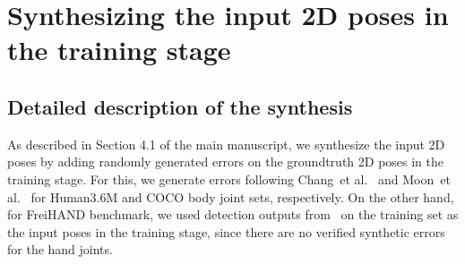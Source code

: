 \documentclass[runningheads]{llncs}
\begin{document}
\begin{table}\setlength{\tabcolsep}{1pt}
\def\arraystretch{1.1}
\centering
{}
\end{table}

\section{Synthesizing the input 2D poses in the training stage}
\subsection{Detailed description of the synthesis}
As described in Section 4.1 of the main manuscript,
we synthesize the input 2D poses by adding randomly generated errors on the groundtruth 2D poses in the training stage.
For this, we generate errors following Chang~et al.~\cite{chang2020abs} and Moon~et al.~\cite{Moon_2019_CVPR_PoseFix} for Human3.6M and COCO body joint sets, respectively.
On the other hand, for FreiHAND benchmark, we used detection outputs from~\cite{sun2019deep} on the training set as the input poses in the training stage, since there are no verified synthetic errors for the hand joints.
\end{document}
